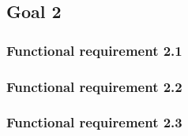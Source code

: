 \subsection{Goal 2}

\setcounter{secnumdepth}{3}
\subsubsection{Functional requirement 2.1}

\subsubsection{Functional requirement 2.2}

\subsubsection{Functional requirement 2.3}
